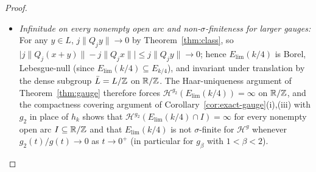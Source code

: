 \begin{proof}
\begin{itemize}[leftmargin=1.8em]
$x(\omega)=\lim_{j\to\infty}M_j/Q_j$ satisfies $|Q_jx(\omega)-M_j|<k/j<1/8$ and
has true recurrence digits $d_j(x(\omega))=d_j\in\{-k,+k\}$ for all $j\ge N$, so
$|d_j(x(\omega))|=k$ and $j\|Q_jx(\omega)\|\to k/4$. Hence the compact binary
Cantor image $K_{\mathrm{bin}}:=x(\{-k,+k\}^{\{j\ge N\}})$ lies entirely inside
$E_{\mathrm{lim}}(k/4)\cap[-4k/Q_{N+1},4k/Q_{N+1}]$ (no strict sublevel needs to
be subtracted). Equip $\{-k,+k\}^{\{j\ge N\}}$ with the uniform Bernoulli
product measure assigning weight $1/2$ to $-k$ and $1/2$ to $+k$, and let
$\mu_{\mathrm{bin}}$ be its pushforward to $K_{\mathrm{bin}}$. As in the proof
of Theorem~\ref{thm:gauge}, any interval $U$ of length
$1/Q_{n+1}\le h<1/Q_n$ ($n>N$) determines a unique $M_j$ for each $N\le j<n$ and
at most $3$ values of $M_n$, so $K_{\mathrm{bin}}\cap U$ meets at most $3$ binary
cylinders of depth $n-N$, each of $\mu_{\mathrm{bin}}$-mass $2^{-(n-N)}$. Thus
\[
\mu_{\mathrm{bin}}(U)\le 3\cdot 2^{-(n-N)}=3\cdot 2^{N+1}\cdot 2^{-(n+1)}
\le 3\cdot 2^{N+1}g_2(h),
\]
and the mass distribution principle gives
$\mathcal H^{g_2}(E_{\mathrm{lim}}(k/4))\ge\mathcal H^{g_2}(K_{\mathrm{bin}})\ge(3\cdot 2^{N+1})^{-1}>0$.
\item \emph{Infinitude on every nonempty open arc and non-$\sigma$-finiteness for larger gauges:}
For any $y\in L$, $j\|Q_jy\|\to0$ by Theorem~\ref{thm:class}, so
$\bigl|j\|Q_j(x+y)\|-j\|Q_jx\|\bigr|\le j\|Q_jy\|\to0$; hence
$E_{\mathrm{lim}}(k/4)$ is Borel, Lebesgue-null (since
$E_{\mathrm{lim}}(k/4)\subseteq E_{k/4}$), and invariant under translation by
the dense subgroup $\bar L=L/\mathbb{Z}$ on $\mathbb{R}/\mathbb{Z}$. The Haar-uniqueness argument of
Theorem~\ref{thm:gauge} therefore forces
$\mathcal H^{g_2}(E_{\mathrm{lim}}(k/4))=\infty$ on $\mathbb{R}/\mathbb{Z}$, and the compactness
covering argument of Corollary~\ref{cor:exact-gauge}(i),(iii) with $g_2$ in
place of $h_k$ shows that $\mathcal H^{g_2}(E_{\mathrm{lim}}(k/4)\cap I)=\infty$
for every nonempty open arc $I\subseteq\mathbb{R}/\mathbb{Z}$ and that $E_{\mathrm{lim}}(k/4)$
is not $\sigma$-finite for $\mathcal H^g$ whenever $g_2(t)/g(t)\to0$ as
$t\to0^+$ (in particular for $g_\beta$ with $1<\beta<2$).
\end{itemize}


\end{proof}
